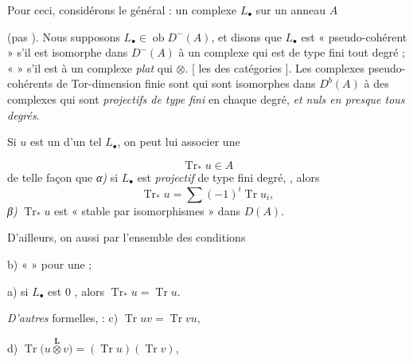 \documentclass[11pt,a4paper]{article}
\begin{document}
Pour ceci, considérons le  général 
: un complexe $L_\bullet$ sur un anneau  $A$

(pas  ). Nous supposons
$L_\bullet \in \operatorname{ob} D^-(A)$, et disons que $L_\bullet$ est
« pseudo-cohérent » s'il est isomorphe dans $D^-(A)$ à un complexe qui est
 \ill{} de type fini
 tout degré ; \add{(\ill{} \ill{} \ill{} \ill{})} « \ill{}
 » s'il est  \ill{}
\struck{\ill{}} à un complexe \textit{plat} qui \ill{} \ill{} \ill{}
$\otimes$. [ les  \ill{} \ill{}
\ill{} \ill{} \ill{} \ill{} \ill{} \ill{}  des
\ill{} \ill{} \ill{} catégories ]. Les complexes
pseudo-cohérents de Tor-dimension finie sont  qui sont
isomorphes  dans $D^b(A)$ à des complexes qui
sont \textit{projectifs de type fini} en chaque degré, \textit{et nuls en
presque tous degrés}.

Si $u$ est un  d'un tel $L_\bullet$, on peut lui
associer une 

\[
  \operatorname{Tr}_* u \in A
\]
de telle façon que \textit{α)} si $L_\bullet$ est \textit{projectif} de type
fini  degré,   \ill{}
\ill{}, alors
\[
  \operatorname{Tr}_* u = \sum (-1)^i \operatorname{Tr} u_i ,
\]
\ill{} \textit{β)} $\operatorname{Tr}_* u$ est « stable par
isomorphismes » dans $D(A)$.

D'ailleurs, on   aussi
 par l'ensemble des conditions

b) «  » pour une 
\ill{} \ill{} \ill{} ;

a) si $L_\bullet$ est  $0$ \ill{}
\ill{}, alors $\operatorname{Tr}_* u = \operatorname{Tr} u$.

 \textit{D'autres}  formelles,
 \ill{} :
c) $\operatorname{Tr} uv = \operatorname{Tr} vu$,

d) $\operatorname{Tr}\bigl(u \overset{\mathbf{L}}{\otimes} v\bigr)
= (\operatorname{Tr} u)(\operatorname{Tr} v)$,
\end{document}
